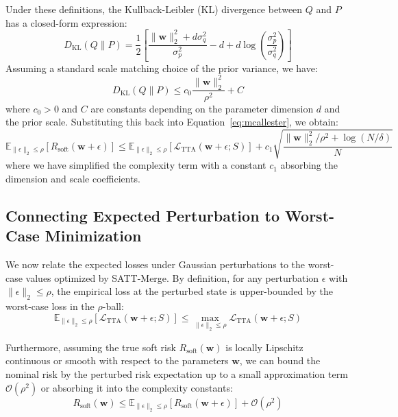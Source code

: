 \documentclass{article}
\begin{document}
Under these definitions, the Kullback-Leibler (KL) divergence between $Q$ and $P$ has a closed-form expression:
\begin{equation}
    D_{\text{KL}}(Q \parallel P) = \frac{1}{2} \left[ \frac{\|\mathbf{w}\|_2^2 + d \sigma_q^2}{\sigma_p^2} - d + d \log\left(\frac{\sigma_p^2}{\sigma_q^2}\right) \right]
\end{equation}
Assuming a standard scale matching choice of the prior variance, we have:
\begin{equation}
    D_{\text{KL}}(Q \parallel P) \le c_0 \frac{\|\mathbf{w}\|_2^2}{\rho^2} + C
\end{equation}
where $c_0 > 0$ and $C$ are constants depending on the parameter dimension $d$ and the prior scale. Substituting this back into Equation~\eqref{eq:mcallester}, we obtain:
\begin{equation}
    \mathbb{E}_{\|\epsilon\|_2 \le \rho} [ R_{\text{soft}}(\mathbf{w} + \epsilon) ] \le \mathbb{E}_{\|\epsilon\|_2 \le \rho} [ \mathcal{L}_{\text{TTA}}(\mathbf{w} + \epsilon; S) ] + c_1 \sqrt{\frac{\|\mathbf{w}\|_2^2 / \rho^2 + \log(N / \delta)}{N}}
    \label{eq:perturbed_pac}
\end{equation}
where we have simplified the complexity term with a constant $c_1$ absorbing the dimension and scale coefficients.

\subsection{Connecting Expected Perturbation to Worst-Case Minimization}
We now relate the expected losses under Gaussian perturbations to the worst-case values optimized by SATT-Merge. 
By definition, for any perturbation $\epsilon$ with $\|\epsilon\|_2 \le \rho$, the empirical loss at the perturbed state is upper-bounded by the worst-case loss in the $\rho$-ball:
\begin{equation}
    \mathbb{E}_{\|\epsilon\|_2 \le \rho} [ \mathcal{L}_{\text{TTA}}(\mathbf{w} + \epsilon; S) ] \le \max_{\|\epsilon\|_2 \le \rho} \mathcal{L}_{\text{TTA}}(\mathbf{w} + \epsilon; S)
\end{equation}

Furthermore, assuming the true soft risk $R_{\text{soft}}(\mathbf{w})$ is locally Lipschitz continuous or smooth with respect to the parameters $\mathbf{w}$, we can bound the nominal risk by the perturbed risk expectation up to a small approximation term $\mathcal{O}(\rho^2)$ or absorbing it into the complexity constants:
\begin{equation}
    R_{\text{soft}}(\mathbf{w}) \le \mathbb{E}_{\|\epsilon\|_2 \le \rho} [ R_{\text{soft}}(\mathbf{w} + \epsilon) ] + \mathcal{O}(\rho^2)
\end{equation}
\end{document}
